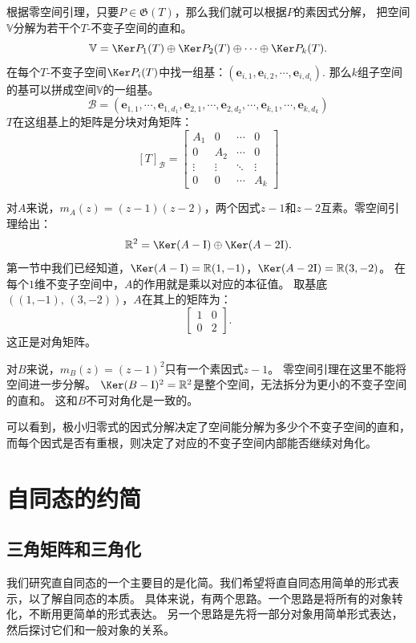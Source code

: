 \documentclass[12pt,UTF8,fontset=none]{ctexbook}
\begin{document}
根据零空间引理，只要$P\in\mathfrak{G}(T)$，那么我们就可以根据$P$的素因式分解，
把空间$\mathbb{V}$分解为若干个$T$-不变子空间的直和。
$$ \mathbb{V} = \Ker P_1(T) \oplus \Ker P_2(T) \oplus \cdots \oplus \Ker P_k(T). $$
在每个$T$-不变子空间$\Ker P_i(T)$中找一组基：$(\mathbf{e}_{i,1}, \mathbf{e}_{i,2}, \cdots , \mathbf{e}_{i, d_i})$.
那么$k$组子空间的基可以拼成空间$\mathbb{V}$的一组基。
$$ \mathcal{B} = (\mathbf{e}_{1,1}, \cdots , \mathbf{e}_{1, d_1},\mathbf{e}_{2,1}, \cdots , \mathbf{e}_{2, d_2}, \cdots , \mathbf{e}_{k,1}, \cdots , \mathbf{e}_{k, d_k})$$
$T$在这组基上的矩阵是分块对角矩阵：
$$ [T]_{\mathcal{B}} = \begin{bmatrix} A_1 & 0 & \cdots & 0 \\ 0 & A_2 & \cdots & 0 \\ \vdots & \vdots & \ddots & \vdots \\ 0 & 0 & \cdots & A_k\end{bmatrix}$$

对$A$来说，$m_A(z) = (z-1)(z-2)$，两个因式$z-1$和$z-2$互素。零空间引理给出：
$$
\mathbb{R}^2 = \Ker(A-\mathrm{I}) \oplus \Ker(A-2\mathrm{I}).
$$
第一节中我们已经知道，$\Ker(A-\mathrm{I}) = \mathbb{R}(1,-1)$，$\Ker(A-2\mathrm{I}) = \mathbb{R}(3,-2)$。
在每个$1$维不变子空间中，$A$的作用就是乘以对应的本征值。
取基底$((1,-1),\, (3,-2))$，$A$在其上的矩阵为：
$$
\begin{bmatrix} 1 & 0 \\ 0 & 2 \end{bmatrix}.
$$
这正是对角矩阵。

对$B$来说，$m_B(z) = (z-1)^2$只有一个素因式$z-1$。
零空间引理在这里不能将空间进一步分解。
$\Ker(B-\mathrm{I})^2 = \mathbb{R}^2$是整个空间，无法拆分为更小的不变子空间的直和。
这和$B$不可对角化是一致的。

可以看到，极小归零式的因式分解决定了空间能分解为多少个不变子空间的直和，
而每个因式是否有重根，则决定了对应的不变子空间内部能否继续对角化。

\section{自同态的约简}
\subsection{三角矩阵和三角化}
我们研究直自同态的一个主要目的是化简。我们希望将直自同态用简单的形式表示，以了解自同态的本质。
具体来说，有两个思路。一个思路是将所有的对象转化，不断用更简单的形式表达。
另一个思路是先将一部分对象用简单形式表达，然后探讨它们和一般对象的关系。
\end{document}
